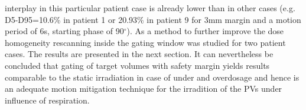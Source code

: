 interplay in this particular patient case is already lower than in other cases (e.g. D5-D95=10.6\% in patient 1 or 20.93\% in patient 9 
for 3mm margin and a motion period of 6s, starting phase of 90$^{\circ}$).\newline
\newline
As a method to further improve the dose homogeneity rescanning inside the gating window was studied for two patient cases. The results are 
presented in the next section. It can nevertheless be concluded that gating of target volumes with safety margin yields results comparable to 
the static irradiation in case of under and overdosage and hence is an adequate motion mitigation technique for the irradition of the 
PVs under influence of respiration. 



\newpage


